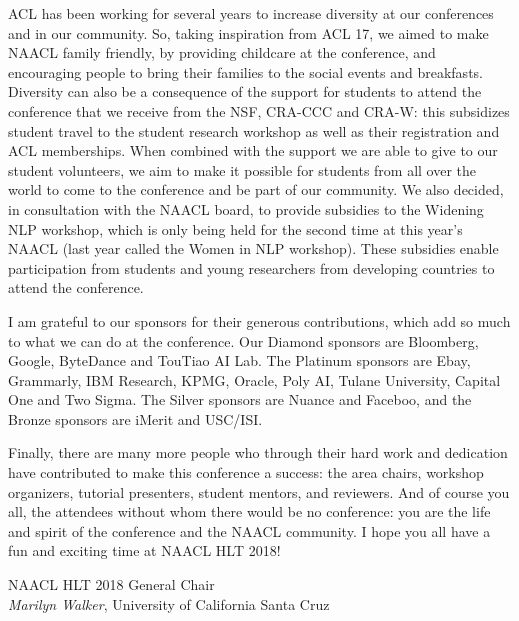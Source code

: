 ACL has been working for several years to increase diversity at our
conferences and in our community. So, taking inspiration from ACL 17,
we aimed to make NAACL family friendly, by providing childcare at the
conference, and encouraging people to bring their families to the
social events and breakfasts. Diversity can also be a consequence of
the support for students to attend the conference that we receive from
the NSF, CRA-CCC and CRA-W: this subsidizes student travel to the student
research workshop as well as their registration and ACL
memberships. When combined with the support we are able to give to our
student volunteers, we aim to make it possible for students from all
over the world to come to the conference and be part of our
community. We also decided, in consultation with the NAACL board, to
provide subsidies to the Widening NLP workshop, which is only being
held for the second time at this year's NAACL (last year called the
Women in NLP workshop).  These subsidies enable participation from
students and young researchers from developing countries to attend the
conference.


I am grateful to our sponsors for their generous contributions, which
add so much to what we can do at the conference.  Our Diamond sponsors
are Bloomberg, Google, ByteDance and TouTiao AI Lab. The Platinum
sponsors are Ebay, Grammarly, IBM Research, KPMG, Oracle, Poly AI,
Tulane University, Capital One and Two Sigma. The Silver sponsors are Nuance and
Faceboo, and the Bronze sponsors are iMerit and USC/ISI.

Finally, there are many more people who through their hard work and
dedication have contributed to make this conference a success: the
area chairs, workshop organizers, tutorial presenters, student
mentors, and reviewers. And of course you all, the attendees without
whom there would be no conference: you are the life and spirit of the
conference and the NAACL community. I hope you all have a
fun and exciting time at NAACL HLT 2018!

NAACL HLT 2018 General Chair \\
{\it Marilyn Walker}, University of California Santa Cruz 
